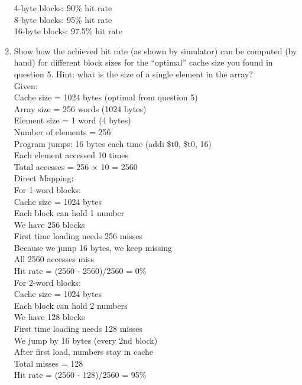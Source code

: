 \documentclass{article}\\
\begin{document}
\begin{enumerate}
    4-byte blocks: 90\% hit rate\\
    8-byte blocks: 95\% hit rate\\
    16-byte blocks: 97.5\% hit rate\\

    \item Show how the achieved hit rate (as shown by simulator) can be computed (by hand) for different block sizes for the ``optimal'' cache size you found in question 5. Hint: what is the size of a single element in the array?\\
    
    Given:\\
    Cache size = 1024 bytes (optimal from question 5)\\
    Array size = 256 words (1024 bytes)\\
    Element size = 1 word (4 bytes)\\
    Number of elements = 256\\
    Program jumps: 16 bytes each time (addi \$t0, \$t0, 16)\\
    Each element accessed 10 times\\
    Total accesses = 256 × 10 = 2560\\
    
    Direct Mapping:\\
    
    For 1-word blocks:\\
    Cache size = 1024 bytes\\
    Each block can hold 1 number\\
    We have 256 blocks\\
    First time loading needs 256 misses\\
    Because we jump 16 bytes, we keep missing\\
    All 2560 accesses miss\\
    Hit rate = (2560 - 2560)/2560 = 0\%\\
    
    For 2-word blocks:\\
    Cache size = 1024 bytes\\
    Each block can hold 2 numbers\\
    We have 128 blocks\\
    First time loading needs 128 misses\\
    We jump by 16 bytes (every 2nd block)\\
    After first load, numbers stay in cache\\
    Total misses = 128\\
    Hit rate = (2560 - 128)/2560 = 95\%\\
    

\end{enumerate}
\end{document}
